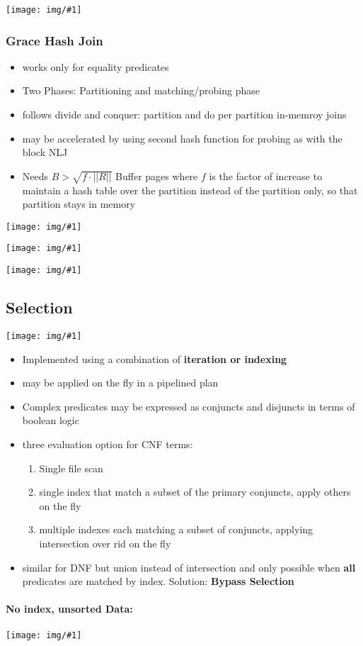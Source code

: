 \documentclass[a4paper]{article}
\newcommand{\img}[1]{\begin{center}
    \texttt{[image: img/\#1]}
\end{center} }
\begin{document}
\begin{twocolumn}
\img{smj_algo}


\subsubsection{Grace Hash Join}
\begin{itemize}
	\item works only for equality predicates
	\item Two Phases: Partitioning and matching/probing phase 
	\item follows divide and conquer: partition and do per partition in-memroy joins
	\item may be accelerated by using second hash function for probing as with the block NLJ
	\item Needs $B > \sqrt{f \cdot ||R||}$ Buffer pages where $f$ is the factor of increase to maintain a hash table over the partition instead of the partition only, so that partition stays in memory
\end{itemize}
\img{ghj_part}
\img{ghj_probe}
\img{ghj_algo}


\subsection{Selection}
\img{selectivity}
\begin{itemize}
	\item Implemented using  a combination of \textbf{iteration or indexing}
	\item may be applied on the fly in a pipelined plan
	\item Complex predicates may be expressed as conjuncts and disjuncts in terms of boolean logic
	\item three evaluation option for CNF terms:
	\begin{enumerate}
		\item Single file scan
		\item single index that match a subset of the primary conjuncts, apply others on the fly 
		\item multiple indexes each matching a subset of conjuncts, applying intersection over rid on the fly
	\end{enumerate}
	\item similar for DNF but union instead of intersection and only possible when \textbf{all} predicates are matched by index. Solution: \textbf{Bypass Selection}
\end{itemize}

\paragraph{No index, unsorted Data:}
\img{selection_basic}


\end{twocolumn}
\end{document}
